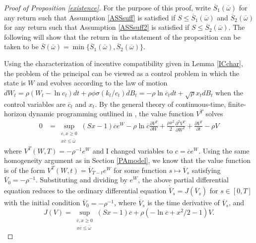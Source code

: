 \documentclass[11pt]{article}
\theoremstyle{plain}
\theoremstyle{definition} %
\begin{document}
\begin{proof}[Proof of Proposition \ref{existence}]
For the purpose of this proof, write $\overline{S}_1(\overline{\omega})$ for any return such that Assumption \ref{ASSsuff} is satisfied if $S \leq \overline{S}_1(\overline{\omega})$ and $\overline{S}_2(\overline{\omega})$ for any return such that Assumption \ref{ASSsuff2} is satisfied if $S \leq \overline{S}_2(\overline{\omega})$. The following will show that the return in the statement of the proposition can be taken to be $\overline{S}(\overline{\omega}) = \min\{\overline{S}_1(\overline{\omega}), \overline{S}_2(\overline{\omega})\}$. 

Using the characterization of incentive compatibility given in Lemma \ref{ICchar}, the problem of the principal can be viewed as a control problem in which the state is $W$ and evolves according to the law of motion $dW_t = \rho(W_t - \ln c_t)dt + \rho \phi \sigma (k_t/c_t)dB_t = - \rho \ln \overline{c}_tdt + \sqrt{\rho} x_tdB_t$ when the control variables are $\overline{c}_t$ and $x_t$. By the general theory of continuous-time, finite-horizon dynamic programming outlined in \cite{kushner_numerical_2001}, the value function $V^T$ solves %
\begin{align*}
0 & = \sup_{\substack{\overline{c},x\geq 0 \\ x\overline{c} \leq \overline{\omega}}} (Sx - 1)\overline{c}e^W - \rho\ln \overline{c} \frac{\partial V^T}{\partial W} + \frac{\rho x^2}{2}\frac{\partial^2V^T}{\partial W^2} + \frac{\partial V^T}{\partial t} - \rho V
\end{align*} %
where $V^T(W,T) = -\rho^{-1}e^W$ and I changed variables to $c = \overline{c}e^W$. Using the same homogeneity argument as in Section \ref{PAmodel}, we know that the value function is of the form $V^T(W,t) = \overline{V}_{T-t}e^{W}$ for some function $s \mapsto \overline{V}_s$ satisfying $\overline{V}_0 = -\rho^{-1}$. Substituting and dividing by $e^W$, the above partial differential equation reduces to the ordinary differential equation $\dot{\overline{V}}_s = J(\overline{V}_s)$ for $s \in [0,T]$ with the initial condition $\overline{V}_0 = -\rho^{-1}$, where $\dot{\overline{V}}_s$ is the time derivative of $\overline{V}_s$, and
\begin{equation}
J(V) = \sup_{\substack{\overline{c}, x\geq 0 \\ x\overline{c} \leq \overline{\omega}}} (Sx - 1)\overline{c} + \rho( -\ln \overline{c} + x^2/2 - 1)V.
\label{Jdef}
\end{equation} 

\end{proof}
\end{document}
